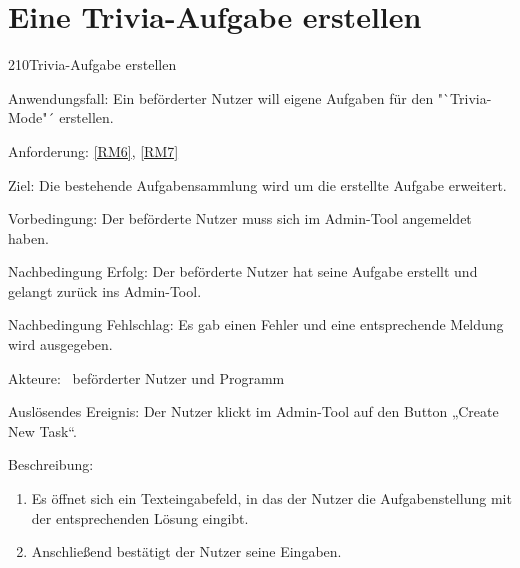 \section{Eine Trivia-Aufgabe erstellen}
\begin{function}{210}{Trivia-Aufgabe erstellen}
\item[Anwendungsfall:] Ein beförderter Nutzer will eigene Aufgaben für den "`Trivia-Mode"´ erstellen.
\item[Anforderung:] \ref{RM6}, \ref{RM7}
\item[Ziel:] Die bestehende Aufgabensammlung wird um die erstellte Aufgabe erweitert.
\item[Vorbedingung:] Der beförderte Nutzer muss sich im Admin-Tool angemeldet haben.
\item[Nachbedingung Erfolg:]  Der beförderte Nutzer hat seine Aufgabe erstellt und gelangt zurück ins Admin-Tool.
\item[Nachbedingung Fehlschlag:] Es gab einen Fehler und eine entsprechende Meldung wird ausgegeben.
\item[Akteure:] ~beförderter Nutzer und Programm
\item[Auslösendes Ereignis:] Der Nutzer klickt im Admin-Tool auf den Button „Create New Task“.
\item[Beschreibung:] ~
\begin{enumerate}
\item  Es öffnet sich ein Texteingabefeld, in das der Nutzer die Aufgabenstellung mit der entsprechenden Lösung eingibt.
\item  Anschließend bestätigt der Nutzer seine Eingaben.
\end{enumerate}
\end{function}

